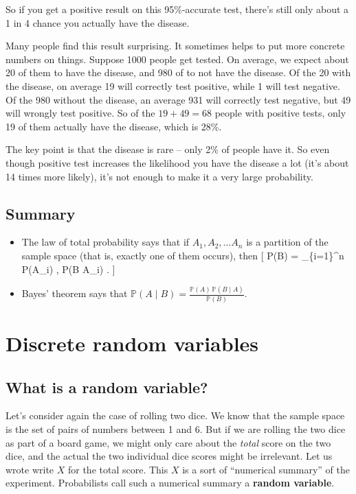 \documentclass[
  letterpaper,
]{report}
\providecommand{\tightlist}{%
  \setlength{\itemsep}{0pt}\setlength{\parskip}{0pt}}\usepackage{longtable,booktabs,array}
\theoremstyle{definition}
\theoremstyle{definition}
\theoremstyle{remark}
\begin{document}
So if you get a positive result on this 95\%-accurate test, there's
still only about a 1 in 4 chance you actually have the disease.

Many people find this result surprising. It sometimes helps to put more
concrete numbers on things. Suppose 1000 people get tested. On average,
we expect about 20 of them to have the disease, and 980 of to not have
the disease. Of the 20 with the disease, on average 19 will correctly
test positive, while 1 will test negative. Of the 980 without the
disease, an average 931 will correctly test negative, but 49 will
wrongly test positive. So of the \(19+49 = 68\) people with positive
tests, only 19 of them actually have the disease, which is 28\%.

The key point is that the disease is rare -- only 2\% of people have it.
So even though positive test increases the likelihood you have the
disease a lot (it's about 14 times more likely), it's not enough to make
it a very large probability.

\hypertarget{summary-L08}{%
\section*{Summary}\label{summary-L08}}


\begin{itemize}
\tightlist
\item
  The law of total probability says that if \(A_1, A_2, \dots A_n\) is a
  partition of the sample space (that is, exactly one of them occurs),
  then {[} \mathbb P(B) = \sum\_\{i=1\}\^{}n \mathbb P(A\_i) ,
  \mathbb P(B \mid A\_i) . {]}
\item
  Bayes' theorem says that
  \({\displaystyle \mathbb P(A \mid B) = \frac{\mathbb P(A) \,\mathbb P(B \mid A)}{\mathbb P(B)} }\).
\end{itemize}

\hypertarget{L09-discrete-rv}{%
\chapter{Discrete random variables}\label{L09-discrete-rv}}

\hypertarget{rv}{%
\section{What is a random variable?}\label{rv}}

Let's consider again the case of rolling two dice. We know that the
sample space is the set of pairs of numbers between 1 and 6. But if we
are rolling the two dice as part of a board game, we might only care
about the \emph{total} score on the two dice, and the actual the two
individual dice scores might be irrelevant. Let us wrote write \(X\) for
the total score. This \(X\) is a sort of ``numerical summary'' of the
experiment. Probabilists call such a numerical summary a \textbf{random
variable}.
\end{document}

